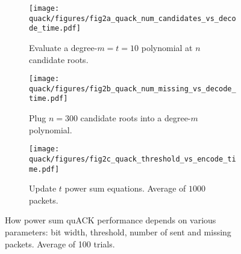 \begin{figure}[t]
\centering
\begin{subfigure}{0.3\columnwidth}
	\texttt{[image: quack/figures/fig2a\_quack\_num\_candidates\_vs\_decode\_time.pdf]}
	\caption{Evaluate a degree-$m=t=10$ polynomial at $n$ candidate roots.}
	\label{fig:quack:psum:n-vs-decoding}
\end{subfigure}
\hspace{-0.1em}
\begin{subfigure}{0.32\columnwidth}
	\texttt{[image: quack/figures/fig2b\_quack\_num\_missing\_vs\_decode\_time.pdf]}
	\caption{Plug $n=300$ candidate roots into a degree-$m$ polynomial.}
	\label{fig:quack:psum:m-vs-decoding}
\end{subfigure}
\hspace{-0.1em}
\begin{subfigure}{0.32\columnwidth}
	\texttt{[image: quack/figures/fig2c\_quack\_threshold\_vs\_encode\_time.pdf]}
	\caption{Update $t$ power sum equations.
	Average of $1000$ packets.}
	\label{fig:quack:psum:construction-time}
\end{subfigure}
\caption{How power sum quACK performance depends on various parameters:
bit width, threshold, number of sent and missing packets.
Average of 100 trials.
}
\label{fig:quack:psum}
\end{figure}
